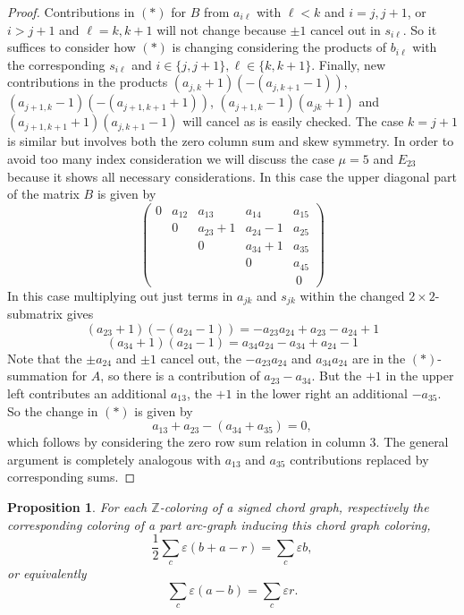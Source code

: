 \documentclass[11pt]{article}
\newtheorem{prop}{Proposition}[section]
\theoremstyle{definition}
\theoremstyle{remark}
\theoremstyle{remark}
\begin{document}
\begin{proof}
Contributions in $(*)$ for $B$ from $a_{i\ell }$ with $\ell <k$ and $i=j,j+1$, or $i>j+1$ and $\ell =k,k+1$ will not change because $\pm 1$ cancel out in $s_{i \ell}$. So it suffices to consider how $(*)$ is changing considering the products of 
$b_{i\ell }$ with the corresponding $s_{i\ell }$ and $i\in \{j,j+1\}, \ell \in \{k,k+1\}$. 
Finally, new contributions in the products $(a_{j,k}+1)(-(a_{j,k+1}-1))$, $(a_{j+1,k}-1)(-(a_{j+1,k+1}+1))$, $(a_{j+1,k}-1)(a_{jk}+1)$ and $(a_{j+1,k+1}+1)(a_{j,k+1}-1)$ will cancel as is easily checked. The case $k=j+1$ is similar but involves both the zero column sum and skew symmetry. In order to avoid too many index consideration we will discuss the case $\mu =5$ and $E_{23}$ because it shows all necessary considerations. In this case the upper diagonal part of the matrix $B$ is given by
$$\begin{pmatrix} 0 & a_{12} & a_{13} & a_{14} & a_{15} \\  \ & 0 & a_{23}+1 & a_{24}-1 & a_{25} \\ \ & \ & 0 & a_{34}+1 & a_{35} \\ \ & \ & \ & 0 & a_{45} \\ \ & \ & \ & \ & \ 0 \end{pmatrix}$$
In this case multiplying out just terms in $a_{jk}$ and $s_{jk}$ within the changed $2\times 2$-submatrix gives 
$$(a_{23}+1)(-(a_{24}-1))=-a_{23}a_{24}+a_{23}-a_{24}+1$$
$$(a_{34}+1)(a_{24}-1)=a_{34}a_{24}-a_{34}+a_{24}-1$$
Note that the $\pm a_{24}$ and $\pm 1$ cancel out, the $-a_{23}a_{24}$ and $a_{34}a_{24}$ are in the $(*)$-summation for $A$, so there is a contribution of $a_{23}-a_{34}$. But the $+1$ in the upper left contributes an additional $a_{13}$, the $+1$ in the lower right an additional $-a_{35}$. So the change in $(*)$ is given by
$$a_{13}+a_{23}-(a_{34}+a_{35})=0,$$
which follows by considering the zero row sum relation in column $3$. The general argument is completely analogous with $a_{13}$ and $a_{35}$ contributions replaced by corresponding sums. 
\end{proof}

\begin{prop} \label{prop=2} For each $\mathbb{Z}$-coloring of a signed chord graph, respectively the corresponding coloring of a part arc-graph inducing this chord graph coloring,
$$\frac{1}{2}\sum_c\varepsilon (b+a-r)=\sum_c\varepsilon b,$$
or equivalently
$$\sum_c\varepsilon (a-b)=\sum_c\varepsilon r.$$
\end{prop}
\end{document}
